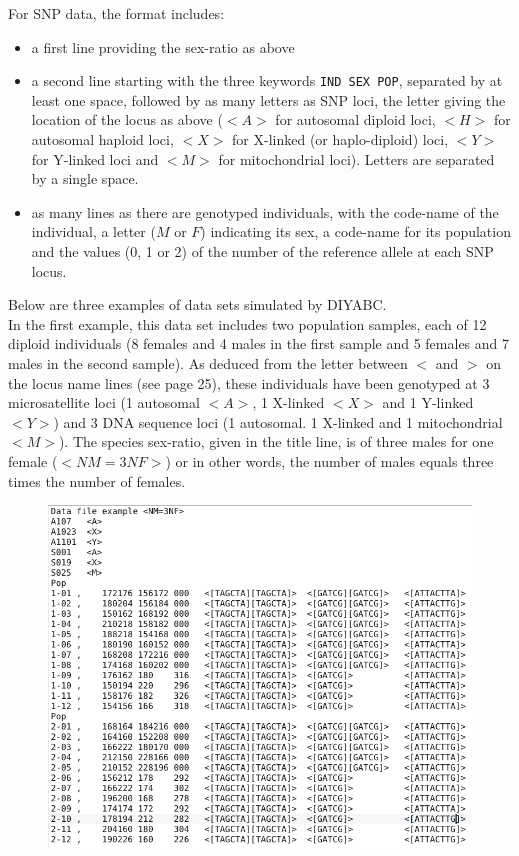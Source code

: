 For SNP data, the format includes:
\begin{itemize}
 \item a first line providing the sex-ratio as above
 \item a second line starting with the three keywords \texttt{IND  SEX  POP}, separated by at least one space, followed by as many letters as SNP loci, the letter giving the location of the locus as above ($<A>$ for autosomal diploid loci, $<H>$ for autosomal haploid loci, $<X>$ for X-linked (or haplo-diploid) loci, $<Y>$ for Y-linked loci and $<M>$ for mitochondrial loci). Letters are separated by a single space.
 \item as many lines as there are genotyped individuals, with the code-name of the individual, a letter ($M$ or $F$) indicating its sex, a code-name for its population and the values (0, 1 or 2) of the number of the reference allele at each SNP locus. 
\end{itemize}


 
Below are three examples of data sets simulated by DIYABC.\\ In the first example, this data set includes two population samples, each of 12 diploid individuals (8 females and 4 males in the first sample and 5 females and 7 males in the second sample). As deduced from the letter between $<$ and $>$ on the locus name lines (see page 25), these individuals have been genotyped at 3 microsatellite loci (1 autosomal $<A>$, 1 X-linked $<X>$ and 1 Y-linked $<Y>$) and 3 DNA sequence loci (1 autosomal. 1 X-linked and 1 mitochondrial $<M>$). The species sex-ratio, given in the title line, is of three males for one female ($<NM=3NF>$) or in other words, the number of males equals three times the number of females. 
\begin{figure}[h]
\includegraphics[scale=0.5]{gui_pictures/screenga001.png}
\end{figure}

